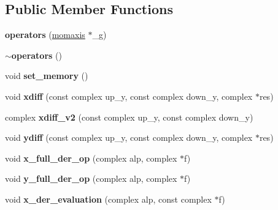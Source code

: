 \subsection*{Public Member Functions}
\begin{DoxyCompactItemize}
\item 
\mbox{\label{classoperators_ae7b42c8f5ae3b6b740e5aa47a8e2961a}} 
{\bfseries operators} (\hyperlink{classmomaxis}{momaxis} $\ast$\+\_\+g)
\item 
\mbox{\label{classoperators_a9686d933e5ed50f905a19f494ed19b2b}} 
{\bfseries $\sim$operators} ()
\item 
\mbox{\label{classoperators_a3a2e6d036be665d319edfead1b9cc407}} 
void {\bfseries set\+\_\+memory} ()
\item 
\mbox{\label{classoperators_a0b9d76317aaa6c2f8fd75f51b86615a4}} 
void {\bfseries xdiff} (const complex up\+\_\+y, const complex down\+\_\+y, complex $\ast$res)
\item 
\mbox{\label{classoperators_ad32ca25bf9ddefd93b0560a0d93f31a1}} 
complex {\bfseries xdiff\+\_\+v2} (const complex up\+\_\+y, const complex down\+\_\+y)
\item 
\mbox{\label{classoperators_afff8b5337888a5bf07c5aa8219ccae26}} 
void {\bfseries ydiff} (const complex up\+\_\+y, const complex down\+\_\+y, complex $\ast$res)
\item 
\mbox{\label{classoperators_a7429f6d7966b0164b1a18c69e76afb6f}} 
void {\bfseries x\+\_\+full\+\_\+der\+\_\+op} (complex alp, complex $\ast$f)
\item 
\mbox{\label{classoperators_abe6c7b396efa78e76e738e2ea52a2ab8}} 
void {\bfseries y\+\_\+full\+\_\+der\+\_\+op} (complex alp, complex $\ast$f)
\item 
\mbox{\label{classoperators_a398a16c8c25659313f3cfd25fc3e607f}} 
void {\bfseries x\+\_\+der\+\_\+evaluation} (complex alp, const complex $\ast$f)
\item 
\mbox{\label{classoperators_a5c9a0945340654bfed9eeef1a3fc3574}} 

\end{DoxyCompactItemize}

